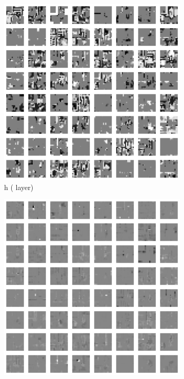 \begin{figure}[h!tb]
\begin{subfigure}{0.24\textwidth}
  \centering
  \includegraphics[width=0.92\linewidth]{figures/learned_rep/pac/1h.png}
  \caption{h \tiny{( layer)}}
  \label{fig:pac-lrep2}
  \vspace{.1cm}
\end{subfigure}
\begin{subfigure}{0.24\textwidth}
  \centering
  \includegraphics[width=0.92\linewidth]{figures/learned_rep/pac/2c.png}

\end{subfigure}
\end{figure}
